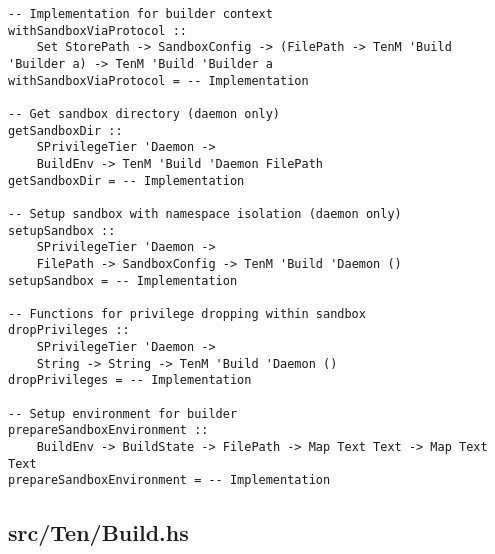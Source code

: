 \documentclass{article}
\begin{document}
\begin{tcolorbox}[title=Ten/Sandbox.hs Changes]
\begin{verbatim}
-- Implementation for builder context
withSandboxViaProtocol ::
    Set StorePath -> SandboxConfig -> (FilePath -> TenM 'Build 'Builder a) -> TenM 'Build 'Builder a
withSandboxViaProtocol = -- Implementation

-- Get sandbox directory (daemon only)
getSandboxDir ::
    SPrivilegeTier 'Daemon ->
    BuildEnv -> TenM 'Build 'Daemon FilePath
getSandboxDir = -- Implementation

-- Setup sandbox with namespace isolation (daemon only)
setupSandbox ::
    SPrivilegeTier 'Daemon ->
    FilePath -> SandboxConfig -> TenM 'Build 'Daemon ()
setupSandbox = -- Implementation

-- Functions for privilege dropping within sandbox
dropPrivileges ::
    SPrivilegeTier 'Daemon ->
    String -> String -> TenM 'Build 'Daemon ()
dropPrivileges = -- Implementation

-- Setup environment for builder
prepareSandboxEnvironment ::
    BuildEnv -> BuildState -> FilePath -> Map Text Text -> Map Text Text
prepareSandboxEnvironment = -- Implementation
\end{verbatim}
\end{tcolorbox}

\subsection{src/Ten/Build.hs}
\end{document}
